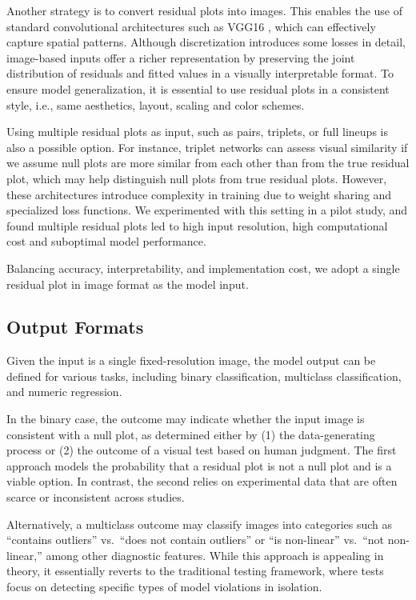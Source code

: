 \documentclass[]{interact}
\theoremstyle{plain}%
\theoremstyle{definition}
\theoremstyle{remark}
\begin{document}
Another strategy is to convert residual plots into images. This enables
the use of standard convolutional architectures such as VGG16
\citep{simonyan2014very}, which can effectively capture spatial
patterns. Although discretization introduces some losses in detail,
image-based inputs offer a richer representation by preserving the joint
distribution of residuals and fitted values in a visually interpretable
format. To ensure model generalization, it is essential to use residual
plots in a consistent style, i.e., same aesthetics, layout, scaling and
color schemes.

Using multiple residual plots as input, such as pairs, triplets, or full
lineups is also a possible option. For instance, triplet networks
\citep{chopra2005learning} can assess visual similarity if we assume
null plots are more similar from each other than from the true residual
plot, which may help distinguish null plots from true residual plots.
However, these architectures introduce complexity in training due to
weight sharing and specialized loss functions. We experimented with this
setting in a pilot study, and found multiple residual plots led to high
input resolution, high computational cost and suboptimal model
performance.

Balancing accuracy, interpretability, and implementation cost, we adopt
a single residual plot in image format as the model input.

\subsection{Output Formats}\label{output-formats}

Given the input is a single fixed-resolution image, the model output can
be defined for various tasks, including binary classification,
multiclass classification, and numeric regression.

In the binary case, the outcome may indicate whether the input image is
consistent with a null plot, as determined either by (1) the
data-generating process or (2) the outcome of a visual test based on
human judgment. The first approach models the probability that a
residual plot is not a null plot and is a viable option. In contrast,
the second relies on experimental data that are often scarce or
inconsistent across studies.

Alternatively, a multiclass outcome may classify images into categories
such as ``contains outliers'' vs.~``does not contain outliers'' or ``is
non-linear'' vs.~``not non-linear,'' among other diagnostic features.
While this approach is appealing in theory, it essentially reverts to
the traditional testing framework, where tests focus on detecting
specific types of model violations in isolation.
\end{document}
